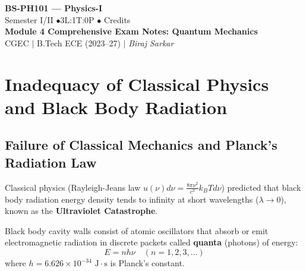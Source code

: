 \documentclass[12pt,a4paper]{article}
\begin{document}
\begin{center}
  {\LARGE\bfseries\color{myred} BS-PH101 --- Physics-I}\\[5pt]
  {\normalsize\color{mydark} Semester I/II \quad$\bullet$\quad 3L:1T:0P \quad$\bullet$ Credits}\\[3pt]
  {\normalsize\color{myteal}\textbf{Module 4 Comprehensive Exam Notes: Quantum Mechanics}}\\[3pt]
  {\small\color{mydark} CGEC \;$|$\; B.Tech ECE (2023--27) \;$|$\; \textit{Biraj Sarkar}}
\end{center}
\vspace{2pt}
\noindent{\color{myred}\rule{\linewidth}{1.5pt}}
\vspace{2pt}
\hypersetup{linkcolor=mydark}
\tableofcontents
\hypersetup{linkcolor=myteal}
\newpage

\section{Inadequacy of Classical Physics and Black Body Radiation}

\subsection{Failure of Classical Mechanics and Planck's Radiation Law}

Classical physics (Rayleigh-Jeans law $u(\nu)d\nu = \frac{8\pi \nu^2}{c^3} k_B T d\nu$) predicted that black body radiation energy density tends to infinity at short wavelengths ($\lambda \to 0$), known as the \textbf{Ultraviolet Catastrophe}.

\begin{tcolorbox}[defbox, title={\textbf{Planck's Quantum Hypothesis (1900)}}]
Black body cavity walls consist of atomic oscillators that absorb or emit electromagnetic radiation in discrete packets called \textbf{quanta} (photons) of energy:
\begin{equation}
E = n h \nu \quad (n = 1, 2, 3, \ldots)
\end{equation}
where $h = 6.626 \times 10^{-34}\text{ J}\cdot\text{s}$ is Planck's constant.
\end{tcolorbox}
\end{document}
